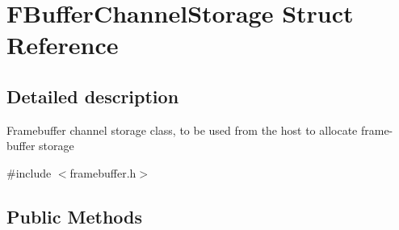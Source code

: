 \hypertarget{struct_f_buffer_channel_storage}{}\section{F\+Buffer\+Channel\+Storage Struct Reference}
\label{struct_f_buffer_channel_storage}


\subsection{Detailed description}
Framebuffer channel storage class, to be used from the host to allocate frame-\/buffer storage 

{\ttfamily \#include $<$framebuffer.\+h$>$}

\subsection*{Public Methods}
